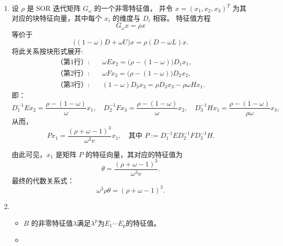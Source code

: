 \documentclass{ctexart}
\begin{document}
\begin{solution}
\begin{enumerate}
\item 设 $\rho$ 是 SOR 迭代矩阵 $G_\omega$ 的一个非零特征值，  
并令 $x = (x_1, x_2, x_3)^T$ 为其对应的块特征向量，其中每个 $x_i$ 的维度与 $D_i$ 相容。  
特征值方程
\[
G_\omega x = \rho x
\]
等价于
\[
\bigl((1-\omega) D + \omega U \bigr) x = \rho (D - \omega L) x.
\]
将此关系按块形式展开:
\begin{align*}
  \text{（第1行）:} &\quad 
  \omega E x_2 = \bigl(\rho - (1-\omega)\bigr) D_1 x_1, \\
  \text{（第2行）:} &\quad 
  \omega F x_3 = \bigl(\rho - (1-\omega)\bigr) D_2 x_2, \\
  \text{（第3行）:} &\quad 
  (1-\omega) D_3 x_3 = \rho D_3 x_3 - \rho \omega H x_1.
\end{align*}
即：
\[
D_1^{-1} E x_2 = \frac{\rho - (1-\omega)}{\omega}  x_1, 
\quad
D_2^{-1} F x_3 = \frac{\rho - (1-\omega)}{\omega}  x_2,
\quad
D_3^{-1} H x_1 = \frac{\rho - (1-\omega) }{\rho \omega}x_3,
\]
从而，
\[
P x_1 = \frac{(\rho  + \omega -1)^3}{\omega^3v} x_1,
\quad \text{其中 } 
P := D_1^{-1} E D_2^{-1} F D_3^{-1} H.
\]

由此可见，$x_1$ 是矩阵 $P$ 的特征向量，其对应的特征值为
\[
  \theta = \frac{(\rho  + \omega -1 )^3}{\omega^3v}.
\]
最终的代数关系式：
\[
\omega^3\rho\theta = (\rho + \omega - 1)^3.
\]
\item 
  \begin{itemize}
    \item \(B \) 的非零特征值\(\lambda \)满足\(\lambda^p \)为\(E_1\cdots E_p \)的特征值。
    \item 
  \end{itemize}
  
\end{enumerate}
\end{solution}
\end{document}
